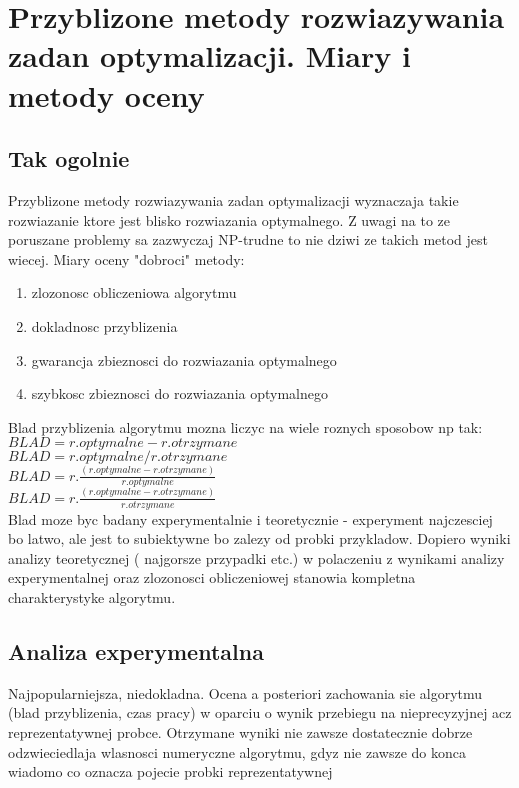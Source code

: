 \section{Przyblizone metody rozwiazywania zadan optymalizacji. Miary i metody oceny}

\subsection{Tak ogolnie}
Przyblizone metody rozwiazywania zadan optymalizacji wyznaczaja takie rozwiazanie ktore jest blisko rozwiazania optymalnego. Z uwagi na to ze poruszane problemy sa zazwyczaj NP-trudne to nie dziwi ze takich metod jest wiecej.
Miary oceny "dobroci" metody:
\begin{enumerate}
\item  zlozonosc obliczeniowa algorytmu
\item dokladnosc przyblizenia
\item gwarancja zbieznosci do rozwiazania optymalnego
\item szybkosc zbieznosci do rozwiazania optymalnego
\end{enumerate}
$ $
\\ Blad przyblizenia algorytmu mozna liczyc na wiele roznych sposobow np tak:
$BLAD = r. optymalne - r.otrzymane $\\
$BLAD = r. optymalne /r.otrzymane $\\
$BLAD = r. \frac{(r.optymalne - r.otrzymane)}{r.optymalne} $\\
$BLAD = r. \frac{(r.optymalne - r.otrzymane)}{r.otrzymane} $\\


Blad moze byc badany experymentalnie i teoretycznie - experyment najczesciej bo latwo, ale jest to subiektywne bo zalezy od probki przykladow. Dopiero wyniki analizy teoretycznej ( najgorsze przypadki etc.) w polaczeniu z wynikami analizy experymentalnej oraz zlozonosci obliczeniowej stanowia kompletna charakterystyke algorytmu.
\\

\subsection{Analiza experymentalna}
Najpopularniejsza, niedokladna. Ocena a posteriori zachowania sie algorytmu (blad przyblizenia, czas pracy) w oparciu o wynik przebiegu na nieprecyzyjnej acz reprezentatywnej probce. Otrzymane wyniki nie zawsze dostatecznie dobrze odzwieciedlaja wlasnosci numeryczne algorytmu, gdyz nie zawsze do konca wiadomo co oznacza pojecie probki reprezentatywnej
